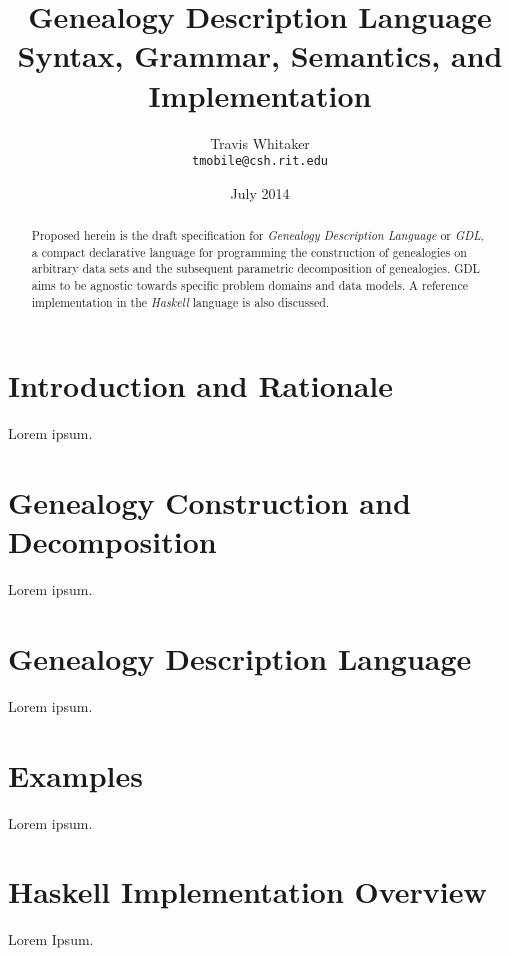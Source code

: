 \documentclass[letterpaper,draft]{article}
\begin{document}

\title{Genealogy Description Language \\
	\vspace{2mm} \large{Syntax, Grammar, Semantics, and Implementation}}
\author{Travis Whitaker \\
	\texttt{tmobile@csh.rit.edu}}
\date{July 2014}
\maketitle

\begin{abstract}

Proposed herein is the draft specification for \emph{Genealogy Description Language} or \emph{GDL},
a compact declarative language for programming the construction of genealogies on arbitrary data
sets and the subsequent parametric decomposition of genealogies. GDL aims to be agnostic towards
specific problem domains and data models. A reference implementation in the \emph{Haskell} language
is also discussed.

\end{abstract}

\pagebreak

\tableofcontents

\pagebreak

\setcounter{page}{1}

\section{Introduction and Rationale}

Lorem ipsum.

\section{Genealogy Construction and Decomposition}

Lorem ipsum.

\section{Genealogy Description Language}

Lorem ipsum.

\section{Examples}

Lorem ipsum.

\section{Haskell Implementation Overview}

Lorem Ipsum.
\end{document}
